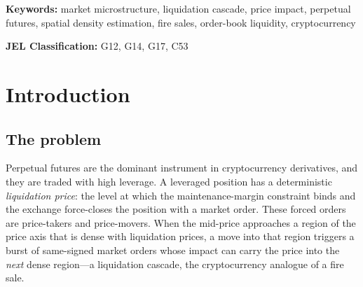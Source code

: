 \documentclass[11pt,a4paper]{article}
\theoremstyle{definition}
\theoremstyle{plain}
\begin{document}
\begin{abstract}
sampling rate is no longer unknown: a $3{,}596$-wallet registry seeded from a $41{,}392$-wallet
leaderboard covers $25$--$38\%$ of venue open interest per symbol, measured and gate-thresholded on
every map. But the measurement also exposes a \emph{second} bias we did not anticipate and which no
rescaling can repair: the wallets that hold notional and the wallets that get liquidated are
different populations. Of $48$ observed liquidations, the registry contained $2.9\%$ of the
liquidated \emph{wallets} but $21.9\%$ of the liquidated \emph{notional}---so the field is far
better at seeing the mass that cascades than the events that start one. That reading is itself
confounded by snapshot timing, and we state the experiment that settles it. We deliberately present
no fabricated performance numbers; empirical validation under the stated protocol is the explicit
next step.
\end{abstract}

\smallskip
\noindent\textbf{Keywords:} market microstructure, liquidation cascade, price impact, perpetual
futures, spatial density estimation, fire sales, order-book liquidity, cryptocurrency

\smallskip
\noindent\textbf{JEL Classification:} G12, G14, G17, C53

\tableofcontents
\bigskip

\section{Introduction}
\label{sec:intro}

\subsection{The problem}

Perpetual futures are the dominant instrument in cryptocurrency derivatives, and they are traded
with high leverage. A leveraged position has a deterministic \emph{liquidation price}: the level at
which the maintenance-margin constraint binds and the exchange force-closes the position with a
market order. These forced orders are price-takers and price-movers. When the mid-price approaches
a region of the price axis that is dense with liquidation prices, a move into that region triggers
a burst of same-signed market orders whose impact can carry the price into the \emph{next} dense
region---a liquidation cascade, the cryptocurrency analogue of a fire sale.
\end{document}
